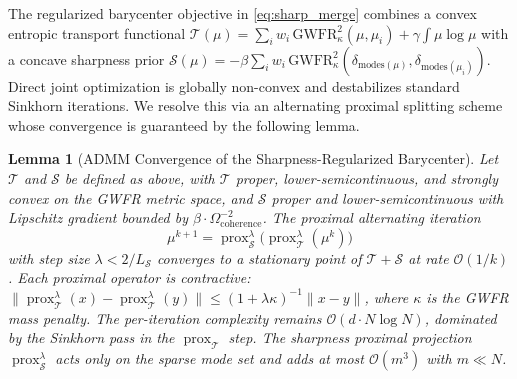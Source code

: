 \documentclass[twocolumn, 10pt, journal, letterpaper]{IEEEtran}
\newtheorem{lemma}{Lemma}
\begin{document}
The regularized barycenter objective in \eqref{eq:sharp_merge} combines a convex entropic transport functional $\mathcal{T}(\mu) = \sum_i w_i \,\text{GWFR}_\kappa^2(\mu,\mu_i) + \gamma \int \mu \log \mu$ with a concave sharpness prior $\mathcal{S}(\mu) = -\beta \sum_i w_i \,\text{GWFR}_\kappa^2(\delta_{\text{modes}(\mu)},\delta_{\text{modes}(\mu_i)})$. Direct joint optimization is globally non-convex and destabilizes standard Sinkhorn iterations. We resolve this via an alternating proximal splitting scheme whose convergence is guaranteed by the following lemma.

\begin{lemma}[ADMM Convergence of the Sharpness-Regularized Barycenter]
Let $\mathcal{T}$ and $\mathcal{S}$ be defined as above, with $\mathcal{T}$ proper, lower-semicontinuous, and strongly convex on the GWFR metric space, and $\mathcal{S}$ proper and lower-semicontinuous with Lipschitz gradient bounded by $\beta \cdot \Omega_{\text{coherence}}^{-2}$. The proximal alternating iteration
\begin{equation}
\mu^{k+1} = \operatorname{prox}_{\mathcal{S}}^{\lambda}\big( \operatorname{prox}_{\mathcal{T}}^{\lambda}(\mu^k) \big)
\label{eq:admm_iter}
\end{equation}
with step size $\lambda < 2 / L_{\mathcal{S}}$ converges to a stationary point of $\mathcal{T} + \mathcal{S}$ at rate $\mathcal{O}(1/k)$. Each proximal operator is contractive: $\|\operatorname{prox}_{\mathcal{T}}^{\lambda}(x) - \operatorname{prox}_{\mathcal{T}}^{\lambda}(y)\| \le (1 + \lambda \kappa)^{-1} \|x - y\|$, where $\kappa$ is the GWFR mass penalty. The per-iteration complexity remains $\mathcal{O}(d \cdot N \log N)$, dominated by the Sinkhorn pass in the $\operatorname{prox}_{\mathcal{T}}$ step. The sharpness proximal projection $\operatorname{prox}_{\mathcal{S}}^{\lambda}$ acts only on the sparse mode set and adds at most $\mathcal{O}(m^3)$ with $m \ll N$.
\end{lemma}
\end{document}
